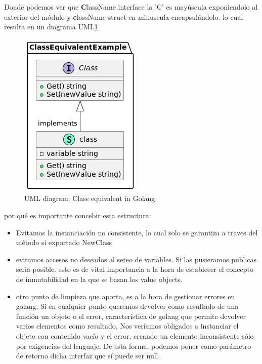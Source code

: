 Donde podemos ver que \textbf{C}lassName interface la 'C' es mayúscula exponiendolo al exterior del módulo y \textbf{c}lassName struct en minuscula encapsulándolo.
lo cual resulta en un diagrama UML\ref{fig: uml Diagram Class Equivalent in Golang}

\begin{figure}[H]
    \centering
    \includegraphics[height=0.3\textheight]{./part/Proyecto_ejecutivo/memoria_constructiva/ClassEquivalentInGolang}
    \caption{UML diagram: Class equivalent in Golang}\label{fig: uml Diagram Class Equivalent in Golang}
\end{figure}

por qué es importante concebir esta estructura:

\begin{itemize}
    \item Evitamos la instanciación no consistente, lo cual solo se garantiza a traves del método si exportado NewClass
    \item evitamos accesos no deseados al seteo de variables. Si las pusieramos publicas seria posible. esto es de vital importancia a la hora de establecer el concepto de inmutabilidad en la que se basan los value objects.
    \item otro punto de limpieza que aporta, es a la hora de gestionar errores en golang. Si en cualquier punto queremos devolver como resultado de una función un objeto o el error, característica de golang que permite devolver varios elementos como resultado, Nos veríamos obligados a instanciar el objeto con contenido vacío y el error, creando un elemento inconsistente sólo por exigencias del lenguaje. De esta forma, podemos poner como parámetro de retorno dicha interfaz que sí puede ser null.
\end{itemize}

